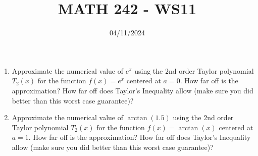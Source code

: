 \documentclass[12pt]{article}
\title{MATH 242 - WS11}
\date{04/11/2024}
\begin{document}
\maketitle


\begin{enumerate}

\item Approximate the numerical value of $e^{\pi}$ using the $2$nd order Taylor polynomial $T_2(x)$ for the function $f(x)=e^x$ centered at $a=0$. How far off is the approximation? How far off does Taylor's Inequality allow (make sure you did better than this worst case guarantee)?
\newpage
\item Approximate the numerical value of $\arctan(1.5)$ using the $2$nd order Taylor polynomial $T_2(x)$ for the function $f(x)=\arctan(x)$ centered at $a=1$. How far off is the approximation? How far off does Taylor's Inequality allow (make sure you did better than this worst case guarantee)?


\end{enumerate}
\end{document}
